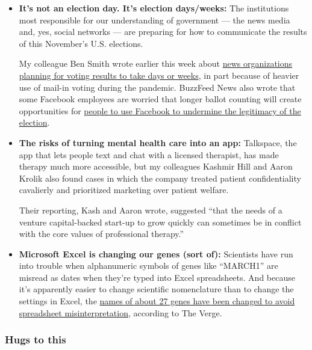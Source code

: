 \begin{itemize}
\item
  \textbf{It's not an election day. It's election days/weeks:} The
  institutions most responsible for our understanding of government ---
  the news media and, yes, social networks --- are preparing for how to
  communicate the results of this November's U.S. elections.

  My colleague Ben Smith wrote earlier this week about
  \href{https://www.nytimes3xbfgragh.onion/2020/08/02/business/media/election-coverage.html}{news
  organizations planning for voting results to take days or weeks}, in
  part because of heavier use of mail-in voting during the pandemic.
  BuzzFeed News also wrote that some Facebook employees are worried that
  longer ballot counting will create opportunities for
  \href{https://www.buzzfeednews.com/article/craigsilverman/facebook-zuckerberg-what-if-trump-disputes-election-results}{people
  to use Facebook to undermine the legitimacy of the election}.
\item
  \textbf{The risks of turning mental health care into an app:}
  Talkspace, the app that lets people text and chat with a licensed
  therapist, has made therapy much more accessible, but my colleagues
  Kashmir Hill and Aaron Krolik also found cases in which the company
  treated patient confidentiality cavalierly and prioritized marketing
  over patient welfare.

  Their reporting, Kash and Aaron wrote, suggested ``that the needs of a
  venture capital-backed start-up to grow quickly can sometimes be in
  conflict with the core values of professional therapy.''
\item
  \textbf{Microsoft Excel is changing our genes (sort of):} Scientists
  have run into trouble when alphanumeric symbols of genes like
  ``MARCH1'' are misread as dates when they're typed into Excel
  spreadsheets. And because it's apparently easier to change scientific
  nomenclature than to change the settings in Excel, the
  \href{https://www.theverge.com/2020/8/6/21355674/human-genes-rename-microsoft-excel-misreading-dates}{names
  of about 27 genes have been changed to avoid spreadsheet
  misinterpretation}, according to The Verge.
\end{itemize}

\hypertarget{hugs-to-this}{%
\subsubsection{Hugs to this}\label{hugs-to-this}}

